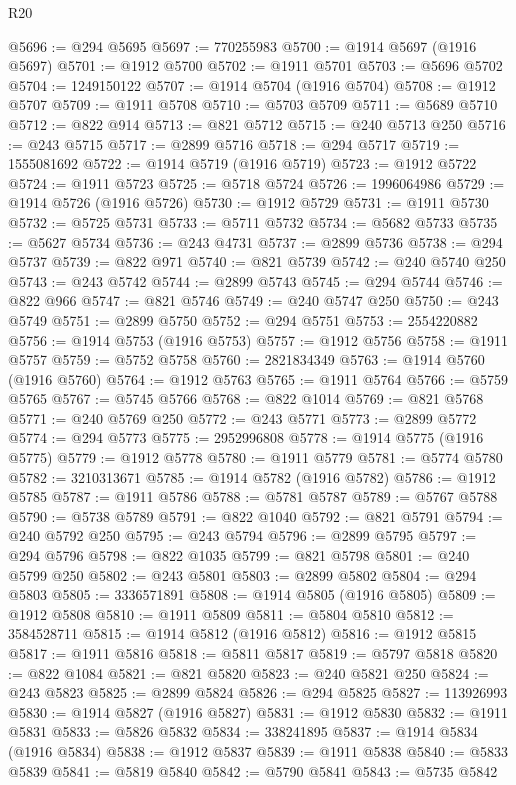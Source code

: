 \begin{lexlean}{R20}
\begin{coremodule}
{@5696 := @294 @5695
@5697 := 770255983
@5700 := @1914 @5697 (@1916 @5697)
@5701 := @1912 @5700
@5702 := @1911 @5701
@5703 := @5696 @5702
@5704 := 1249150122
@5707 := @1914 @5704 (@1916 @5704)
@5708 := @1912 @5707
@5709 := @1911 @5708
@5710 := @5703 @5709
@5711 := @5689 @5710
@5712 := @822 @914
@5713 := @821 @5712
@5715 := @240 @5713 @250
@5716 := @243 @5715
@5717 := @2899 @5716
@5718 := @294 @5717
@5719 := 1555081692
@5722 := @1914 @5719 (@1916 @5719)
@5723 := @1912 @5722
@5724 := @1911 @5723
@5725 := @5718 @5724
@5726 := 1996064986
@5729 := @1914 @5726 (@1916 @5726)
@5730 := @1912 @5729
@5731 := @1911 @5730
@5732 := @5725 @5731
@5733 := @5711 @5732
@5734 := @5682 @5733
@5735 := @5627 @5734
@5736 := @243 @4731
@5737 := @2899 @5736
@5738 := @294 @5737
@5739 := @822 @971
@5740 := @821 @5739
@5742 := @240 @5740 @250
@5743 := @243 @5742
@5744 := @2899 @5743
@5745 := @294 @5744
@5746 := @822 @966
@5747 := @821 @5746
@5749 := @240 @5747 @250
@5750 := @243 @5749
@5751 := @2899 @5750
@5752 := @294 @5751
@5753 := 2554220882
@5756 := @1914 @5753 (@1916 @5753)
@5757 := @1912 @5756
@5758 := @1911 @5757
@5759 := @5752 @5758
@5760 := 2821834349
@5763 := @1914 @5760 (@1916 @5760)
@5764 := @1912 @5763
@5765 := @1911 @5764
@5766 := @5759 @5765
@5767 := @5745 @5766
@5768 := @822 @1014
@5769 := @821 @5768
@5771 := @240 @5769 @250
@5772 := @243 @5771
@5773 := @2899 @5772
@5774 := @294 @5773
@5775 := 2952996808
@5778 := @1914 @5775 (@1916 @5775)
@5779 := @1912 @5778
@5780 := @1911 @5779
@5781 := @5774 @5780
@5782 := 3210313671
@5785 := @1914 @5782 (@1916 @5782)
@5786 := @1912 @5785
@5787 := @1911 @5786
@5788 := @5781 @5787
@5789 := @5767 @5788
@5790 := @5738 @5789
@5791 := @822 @1040
@5792 := @821 @5791
@5794 := @240 @5792 @250
@5795 := @243 @5794
@5796 := @2899 @5795
@5797 := @294 @5796
@5798 := @822 @1035
@5799 := @821 @5798
@5801 := @240 @5799 @250
@5802 := @243 @5801
@5803 := @2899 @5802
@5804 := @294 @5803
@5805 := 3336571891
@5808 := @1914 @5805 (@1916 @5805)
@5809 := @1912 @5808
@5810 := @1911 @5809
@5811 := @5804 @5810
@5812 := 3584528711
@5815 := @1914 @5812 (@1916 @5812)
@5816 := @1912 @5815
@5817 := @1911 @5816
@5818 := @5811 @5817
@5819 := @5797 @5818
@5820 := @822 @1084
@5821 := @821 @5820
@5823 := @240 @5821 @250
@5824 := @243 @5823
@5825 := @2899 @5824
@5826 := @294 @5825
@5827 := 113926993
@5830 := @1914 @5827 (@1916 @5827)
@5831 := @1912 @5830
@5832 := @1911 @5831
@5833 := @5826 @5832
@5834 := 338241895
@5837 := @1914 @5834 (@1916 @5834)
@5838 := @1912 @5837
@5839 := @1911 @5838
@5840 := @5833 @5839
@5841 := @5819 @5840
@5842 := @5790 @5841
@5843 := @5735 @5842
}
\end{coremodule}
\end{lexlean}
